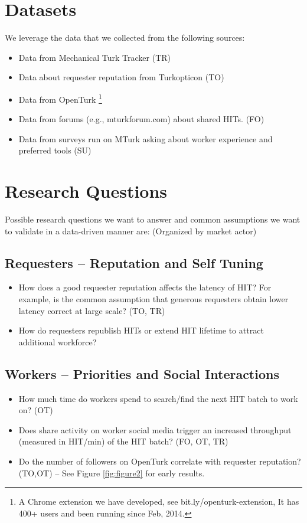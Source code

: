 \documentclass{llncs}
\begin{document}
\section{Datasets}
We leverage the data that we collected from the following sources:
\begin{itemize}
	\item Data from Mechanical Turk Tracker (TR)
	\item Data about requester reputation from Turkopticon (TO)
	\item Data from OpenTurk \footnote{A Chrome extension we have developed, see bit.ly/openturk-extension, It has 400+ users and been running since Feb, 2014.}
	\item Data from forums (e.g., mturkforum.com) about shared HITs. (FO)
	\item Data from surveys run on MTurk asking about worker experience and preferred tools (SU)
\end{itemize}

\pagebreak
\section{Research Questions}

Possible research questions we want to answer and common assumptions we want to validate in a data-driven manner are:
(Organized by market actor)

\subsection{Requesters -- Reputation and Self Tuning}
\begin{itemize}
	\item How does a good requester reputation affects the latency of HIT? 
	For example, is the common assumption that generous requesters obtain lower latency correct at large scale? (TO, TR)
	\item How do requesters republish HITs or extend HIT lifetime to attract additional workforce?
\end{itemize}


\subsection{Workers -- Priorities and Social Interactions}
\begin{itemize}
	\item How much time do workers spend to search/find the next HIT batch to work on? (OT)
	\item Does share activity on worker social media trigger an increased throughput (measured in HIT/min) of the HIT batch? (FO, OT, TR)
	\item Do the number of followers on OpenTurk correlate with requester reputation? (TO,OT) -- See Figure \ref{fig:figure2} for early results.
\end{itemize}
\end{document}
